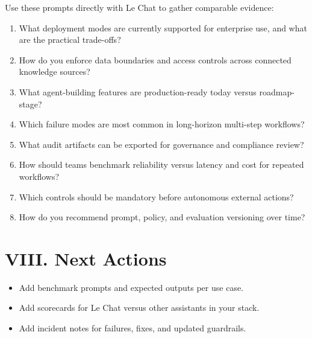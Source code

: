 \documentclass[10pt]{article}
\begin{document}
Use these prompts directly with Le Chat to gather comparable evidence:
\begin{enumerate}
  \item What deployment modes are currently supported for enterprise use, and what are the practical trade-offs?
  \item How do you enforce data boundaries and access controls across connected knowledge sources?
  \item What agent-building features are production-ready today versus roadmap-stage?
  \item Which failure modes are most common in long-horizon multi-step workflows?
  \item What audit artifacts can be exported for governance and compliance review?
  \item How should teams benchmark reliability versus latency and cost for repeated workflows?
  \item Which controls should be mandatory before autonomous external actions?
  \item How do you recommend prompt, policy, and evaluation versioning over time?
\end{enumerate}

\section*{VIII. Next Actions}

\begin{itemize}
  \item Add benchmark prompts and expected outputs per use case.
  \item Add scorecards for Le Chat versus other assistants in your stack.
  \item Add incident notes for failures, fixes, and updated guardrails.
\end{itemize}
\end{document}
